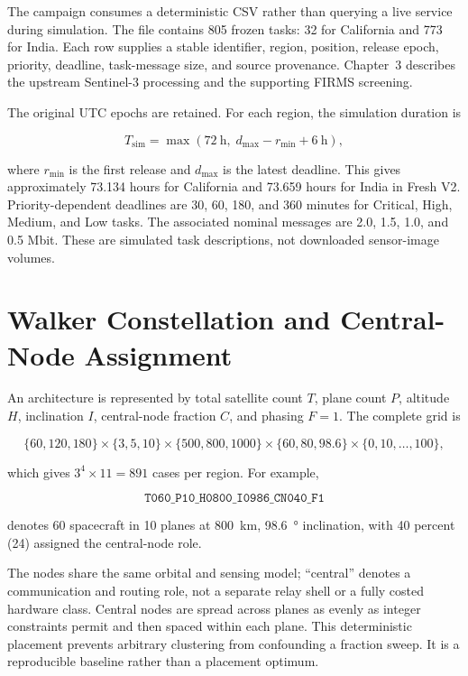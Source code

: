 The campaign consumes a deterministic CSV rather than querying a live service during simulation. The file contains 805 frozen tasks: 32 for California and 773 for India. Each row supplies a stable identifier, region, position, release epoch, priority, deadline, task-message size, and source provenance. Chapter~3 describes the upstream Sentinel-3 processing and the supporting FIRMS screening.

The original UTC epochs are retained. For each region, the simulation duration is

\begin{equation}
T_{\mathrm{sim}}=\max\left(72\ \mathrm{h},\;d_{\max}-r_{\min}+6\ \mathrm{h}\right),
\end{equation}

where $r_{\min}$ is the first release and $d_{\max}$ is the latest deadline. This gives approximately 73.134 hours for California and 73.659 hours for India in Fresh V2. Priority-dependent deadlines are 30, 60, 180, and 360 minutes for Critical, High, Medium, and Low tasks. The associated nominal messages are 2.0, 1.5, 1.0, and 0.5 Mbit. These are simulated task descriptions, not downloaded sensor-image volumes.

\section{Walker Constellation and Central-Node Assignment}

An architecture is represented by total satellite count $T$, plane count $P$, altitude $H$, inclination $I$, central-node fraction $C$, and phasing $F=1$. The complete grid is

\begin{equation}
\{60,120,180\}\!\times\!\{3,5,10\}\!\times\!\{500,800,1000\}
\!\times\!\{60,80,98.6\}\!\times\!\{0,10,\ldots,100\},
\end{equation}

which gives $3^4\times11=891$ cases per region. For example,

\begin{equation}
\texttt{T060\_P10\_H0800\_I0986\_CN040\_F1}
\end{equation}

denotes 60 spacecraft in 10 planes at \SI{800}{\kilo\metre}, \SI{98.6}{\degree} inclination, with 40 percent (24) assigned the central-node role.

The nodes share the same orbital and sensing model; ``central'' denotes a communication and routing role, not a separate relay shell or a fully costed hardware class. Central nodes are spread across planes as evenly as integer constraints permit and then spaced within each plane. This deterministic placement prevents arbitrary clustering from confounding a fraction sweep. It is a reproducible baseline rather than a placement optimum.

